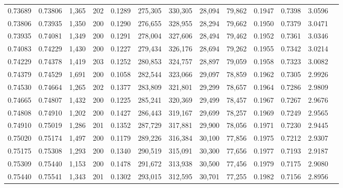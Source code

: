 \begin{tabular}{rrrrrrrrrrrrr}
0.73689 & 0.73806 & 1,365 & 202 &                                     0.1289 & 275,305 & 330,305 &  28,094 &  79,862 & 0.1947 & 0.7398 & 3.0596 \\
0.73806 & 0.73935 & 1,350 & 200 &                                     0.1290 & 276,655 & 328,955 &  28,294 &  79,662 & 0.1950 & 0.7379 & 3.0471 \\
0.73935 & 0.74081 & 1,349 & 200 &                                     0.1291 & 278,004 & 327,606 &  28,494 &  79,462 & 0.1952 & 0.7361 & 3.0346 \\
0.74083 & 0.74229 & 1,430 & 200 &                                     0.1227 & 279,434 & 326,176 &  28,694 &  79,262 & 0.1955 & 0.7342 & 3.0214 \\
0.74229 & 0.74378 & 1,419 & 203 &                                     0.1252 & 280,853 & 324,757 &  28,897 &  79,059 & 0.1958 & 0.7323 & 3.0082 \\
0.74379 & 0.74529 & 1,691 & 200 &                                     0.1058 & 282,544 & 323,066 &  29,097 &  78,859 & 0.1962 & 0.7305 & 2.9926 \\
0.74530 & 0.74664 & 1,265 & 202 &                                     0.1377 & 283,809 & 321,801 &  29,299 &  78,657 & 0.1964 & 0.7286 & 2.9809 \\
0.74665 & 0.74807 & 1,432 & 200 &                                     0.1225 & 285,241 & 320,369 &  29,499 &  78,457 & 0.1967 & 0.7267 & 2.9676 \\
0.74808 & 0.74910 & 1,202 & 200 &                                     0.1427 & 286,443 & 319,167 &  29,699 &  78,257 & 0.1969 & 0.7249 & 2.9565 \\
0.74910 & 0.75019 & 1,286 & 201 &                                     0.1352 & 287,729 & 317,881 &  29,900 &  78,056 & 0.1971 & 0.7230 & 2.9445 \\
0.75020 & 0.75174 & 1,497 & 200 &                                     0.1179 & 289,226 & 316,384 &  30,100 &  77,856 & 0.1975 & 0.7212 & 2.9307 \\
0.75175 & 0.75308 & 1,293 & 200 &                                     0.1340 & 290,519 & 315,091 &  30,300 &  77,656 & 0.1977 & 0.7193 & 2.9187 \\
0.75309 & 0.75440 & 1,153 & 200 &                                     0.1478 & 291,672 & 313,938 &  30,500 &  77,456 & 0.1979 & 0.7175 & 2.9080 \\
0.75440 & 0.75541 & 1,343 & 201 &                                     0.1302 & 293,015 & 312,595 &  30,701 &  77,255 & 0.1982 & 0.7156 & 2.8956 \\

\end{tabular}
